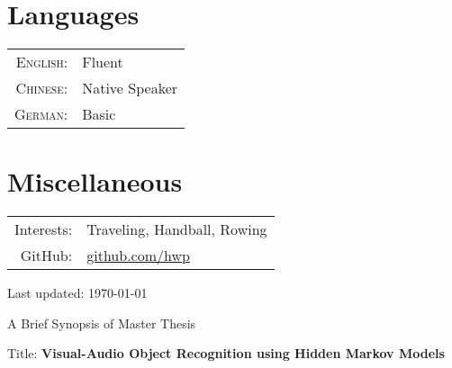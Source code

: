 \documentclass[a4paper,11pt]{article} %
\begin{document}

\section{Languages}

\begin{tabular}{rl}
  \textsc{English:} & Fluent \\
  \textsc{Chinese:} & Native Speaker \\
  \textsc{German:} & Basic \\
\end{tabular}

\section{Miscellaneous}

\begin{tabular}{rl}
  Interests: & Traveling, Handball, Rowing \\
  GitHub: & \href{https://github.com/hwp}{github.com/hwp} \\
\end{tabular}





\vspace{.5cm}
\par{\centering \scriptsize Last updated: \today \par}

\newpage

\par{\centering \Large \hypertarget{synopsis}{A Brief Synopsis of Master Thesis}\par}

Title: \textbf{Visual-Audio Object Recognition using Hidden Markov Models}
\end{document}
